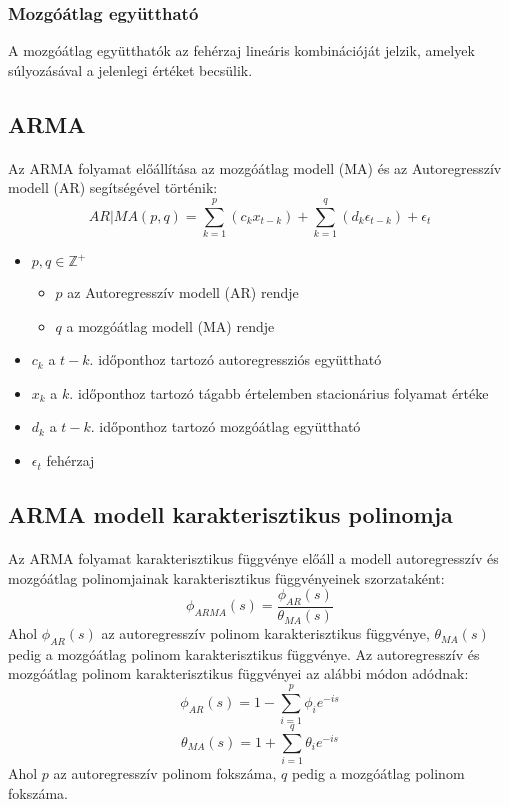 \documentclass[11pt,a4paper]{article}
\begin{document}
					\subsubsection{Mozgóátlag együttható}
						A mozgóátlag együtthatók az fehérzaj lineáris kombinációját jelzik, amelyek súlyozásával a jelenlegi értéket becsülik.
				\subsection{ARMA}
					\paragraph{}
						Az ARMA folyamat előállítása az mozgóátlag modell (MA) és az Autoregresszív modell (AR) segítségével történik:
						$$AR|MA(p,q) = \sum_{k = 1}^p (c_k x_{t-k}) + \sum_{k=1}^q(d_k \epsilon_{t-k}) + \epsilon_t$$
						\begin{itemize}
							\item $p,q \in \mathbb{Z}^+$
							\begin{itemize}
								\item $p$ az Autoregresszív modell (AR) rendje
								\item $q$ a mozgóátlag modell (MA) rendje
							\end{itemize}
							\item $c_k$ a $t-k.$ időponthoz tartozó autoregressziós együttható
							\item $x_k$ a $k.$ időponthoz tartozó tágabb értelemben stacionárius folyamat értéke
							\item $d_k$ a $t-k.$ időponthoz tartozó mozgóátlag együttható
							\item $\epsilon_t$ fehérzaj
						\end{itemize}
				\subsection{ARMA modell karakterisztikus polinomja}
					\paragraph{}
						Az ARMA folyamat karakterisztikus függvénye előáll a modell autoregresszív és mozgóátlag polinomjainak karakterisztikus függvényeinek szorzataként:
						$$\phi_{ARMA}(s) = \frac{\phi_{AR}(s)}{\theta_{MA}(s)}$$
						Ahol $\phi_{AR}(s)$ az autoregresszív polinom karakterisztikus függvénye, $\theta_{MA}(s)$ pedig a mozgóátlag polinom karakterisztikus függvénye. Az autoregresszív és mozgóátlag polinom karakterisztikus függvényei az alábbi módon adódnak:
						$$\phi_{AR}(s) = 1 - \sum_{i=1}^p \phi_i e^{-is}$$
						$$\theta_{MA}(s) = 1 + \sum_{i=1}^q \theta_i e^{-is}$$
						Ahol $p$ az autoregresszív polinom fokszáma, $q$ pedig a mozgóátlag polinom fokszáma.
\end{document}
